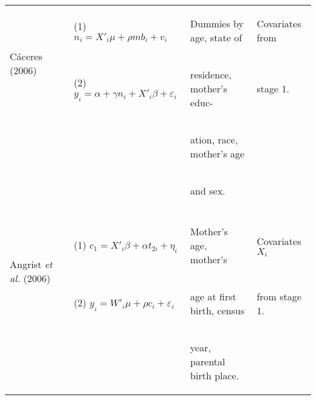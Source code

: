 \documentclass{article}[11pt,subeqn]
\begin{document}
\begin{spacing}{1.5}
\begin{center}
\begin{rotate}{90}
\begin{tabular}{lp{4mm}lll}
\multirow{2}{*}{C\'aceres (2006)} & &
(1) $n_i=X'_i\mu + \rho mb_i + v_i$ &
\begin{small}Dummies by age, state of\end{small}&
\begin{small}Covariates from\end{small}
\\
& &
(2) $y_i=\alpha + \gamma n_i + X'_i\beta + \varepsilon_i$ &
\begin{small}residence, mother's educ- \end{small}&
\begin{small}stage 1.\end{small}
\\
& & &
\begin{small}ation, race, mother's age\end{small}&
\\
& & &
\begin{small}and sex.\end{small}&
\\
\begin{footnotesize}\end{footnotesize}&\begin{footnotesize}\end{footnotesize}&\begin{footnotesize}\end{footnotesize}&\begin{footnotesize}\end{footnotesize}&\begin{footnotesize}\end{footnotesize}\\
\multirow{2}{*}{Angrist \emph{et al.} (2006)} &  &
(1)  $c_1=X'_i\beta+\alpha t_{2i}+\eta_i$ &
\begin{small}Mother's age, mother's \end{small} & 
\begin{small}Covariates $X_i$\end{small}
\\
& &
(2) $y_i=W'_i\mu+\rho c_i + \varepsilon_i$ &  
\begin{small}age at first birth, census \end{small} &
\begin{small}from stage 1.\end{small}
\\
& & &
\begin{small}year, parental birth place.\end{small}&
\\

\end{tabular}
\end{rotate}
\end{center}
\end{spacing}
\end{document}
